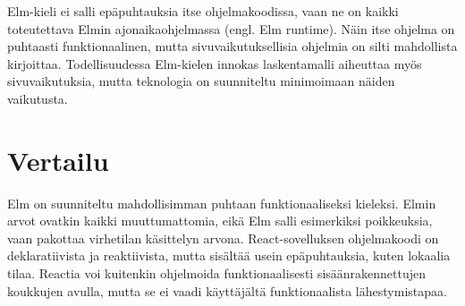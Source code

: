 Elm-kieli ei salli epäpuhtauksia itse ohjelmakoodissa, vaan ne on kaikki toteutettava Elmin ajonaikaohjelmassa (engl.
Elm runtime). Näin itse ohjelma on puhtaasti funktionaalinen, mutta sivuvaikutuksellisia ohjelmia on silti mahdollista
kirjoittaa. Todellisuudessa Elm-kielen innokas laskentamalli aiheuttaa myös sivuvaikutuksia, mutta teknologia on
suunniteltu minimoimaan näiden vaikutusta. \cite{elmlang}

\section{Vertailu}
Elm on suunniteltu mahdollisimman puhtaan funktionaaliseksi kieleksi. Elmin arvot ovatkin kaikki muuttumattomia, eikä Elm
salli esimerkiksi poikkeuksia, vaan pakottaa virhetilan käsittelyn arvona. React-sovelluksen ohjelmakoodi on
deklaratiivista ja reaktiivista, mutta sisältää usein epäpuhtauksia, kuten lokaalia tilaa. Reactia voi kuitenkin
ohjelmoida funktionaalisesti sisäänrakennettujen koukkujen avulla, mutta se ei vaadi käyttäjältä funktionaalista
lähestymistapaa.
